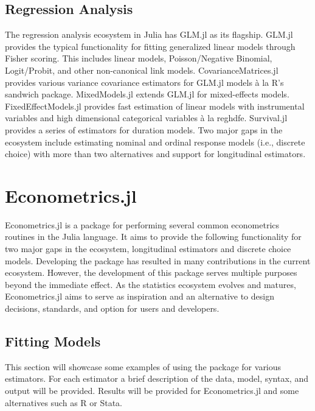 \documentclass{juliacon}
\begin{document}
\subsection{Regression Analysis}

The regression analysis ecosystem in Julia has GLM.jl \cite{GLM.jl} as its flagship. GLM.jl provides the typical functionality for fitting generalized linear models through Fisher scoring. This includes linear models, Poisson/Negative Binomial, Logit/Probit, and other non-canonical link models. CovarianceMatrices.jl \cite{CovarianceMatrices.jl} provides various variance covariance estimators for GLM.jl models à la R's
sandwich package. MixedModels.jl \cite{MixedModels.jl} extends GLM.jl for mixed-effects models. FixedEffectModels.jl provides fast estimation of linear models with instrumental variables and high dimensional categorical variables à la reghdfe. Survival.jl \cite{Survival.jl} provides a series of estimators for duration models. Two major gaps in the ecosystem include estimating nominal and ordinal response models (i.e., discrete choice) with more than two alternatives and support for longitudinal estimators.

\section{Econometrics.jl}

Econometrics.jl is a package for performing several common econometrics routines in the Julia language. It aims to provide the following functionality for two major gaps in the ecosystem, longitudinal estimators and discrete choice models. Developing the package has resulted in many contributions in the current ecosystem. However, the development of this package serves multiple purposes beyond the immediate effect. As the statistics ecosystem evolves and matures, Econometrics.jl aims to serve as inspiration and an alternative to design decisions, standards, and option for users and developers.

\subsection{Fitting Models}

This section will showcase some examples of using the package for various estimators. For each estimator a brief description of the data, model, syntax, and output will be provided. Results will be provided for Econometrics.jl and some alternatives such as R or Stata.
\end{document}
